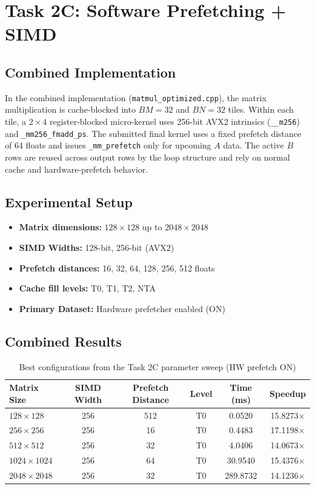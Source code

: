 
\section{Task 2C: Software Prefetching + SIMD}

\subsection{Combined Implementation}
In the combined implementation (\texttt{matmul\_optimized.cpp}), the matrix multiplication is cache-blocked into $BM=32$ and $BN=32$ tiles. Within each tile, a $2 \times 4$ register-blocked micro-kernel uses 256-bit AVX2 intrinsics (\texttt{\_\_m256}) and \texttt{\_mm256\_fmadd\_ps}. The submitted final kernel uses a fixed prefetch distance of 64 floats and issues \texttt{\_mm\_prefetch} only for upcoming $A$ data. The active $B$ rows are reused across output rows by the loop structure and rely on normal cache and hardware-prefetch behavior.

\subsection{Experimental Setup}
\begin{itemize}
    \item \textbf{Matrix dimensions:} $128 \times 128$ up to $2048 \times 2048$
    \item \textbf{SIMD Widths:} 128-bit, 256-bit (AVX2)
    \item \textbf{Prefetch distances:} 16, 32, 64, 128, 256, 512 floats
    \item \textbf{Cache fill levels:} T0, T1, T2, NTA
    \item \textbf{Primary Dataset:} Hardware prefetcher enabled (ON)
\end{itemize}

\subsection{Combined Results}

\begin{table}[H]
\centering
\caption{Best configurations from the Task 2C parameter sweep (HW prefetch ON)}
\begin{tabular}{lccccc}
\toprule
Matrix Size & SIMD Width & Prefetch Distance & Level & Time (ms) & Speedup \\
\midrule
$128 \times 128$   & 256 & 512 & T0 & 0.0520  & 15.8273$\times$ \\
$256 \times 256$   & 256 & 16  & T0 & 0.4483  & 17.1198$\times$ \\
$512 \times 512$   & 256 & 32  & T0 & 4.0406  & 14.0673$\times$ \\
$1024 \times 1024$ & 256 & 64  & T0 & 30.9540 & 15.4376$\times$ \\
$2048 \times 2048$ & 256 & 32  & T0 & 289.8732& 14.1236$\times$ \\
\bottomrule
\end{tabular}
\end{table}

